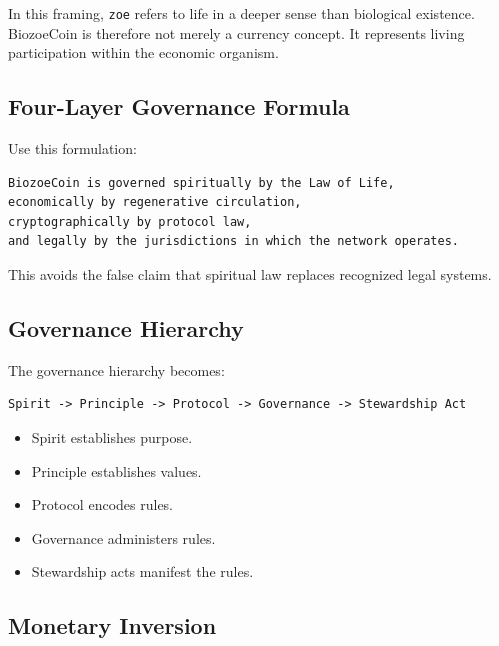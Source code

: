 ﻿\documentclass[12pt]{article}
\begin{document}
In this framing, \texttt{zoe} refers to life in a deeper sense than biological existence. BiozoeCoin is therefore not merely a currency concept. It represents living participation within the economic organism.

\subsection{Four-Layer Governance Formula}


Use this formulation:

\begin{verbatim}
BiozoeCoin is governed spiritually by the Law of Life,
economically by regenerative circulation,
cryptographically by protocol law,
and legally by the jurisdictions in which the network operates.
\end{verbatim}

This avoids the false claim that spiritual law replaces recognized legal systems.

\subsection{Governance Hierarchy}


The governance hierarchy becomes:

\begin{verbatim}
Spirit -> Principle -> Protocol -> Governance -> Stewardship Act
\end{verbatim}

\begin{itemize}
  \item Spirit establishes purpose.
\end{itemize}
\begin{itemize}
  \item Principle establishes values.
\end{itemize}
\begin{itemize}
  \item Protocol encodes rules.
\end{itemize}
\begin{itemize}
  \item Governance administers rules.
\end{itemize}
\begin{itemize}
  \item Stewardship acts manifest the rules.
\end{itemize}

\subsection{Monetary Inversion}
\end{document}

